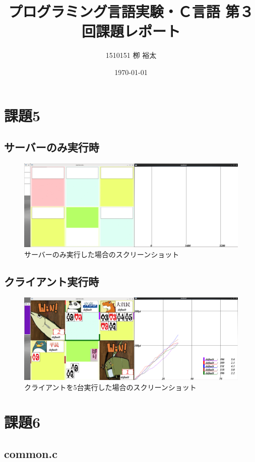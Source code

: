 \documentclass[11pt,a4paper, uplatex]{jsarticle}
\title{プログラミング言語実験・Ｃ言語 第３回課題レポート}
\author{1510151  栁 裕太}
\date{\today}
\begin{document}
\maketitle
\section{課題5}
%
\subsection{サーバーのみ実行時}

\begin{figure}[h]
  \centering
  \caption{サーバーのみ実行した場合のスクリーンショット}
  \includegraphics[width=120mm]{ex5-scs.png}
\end{figure}
\subsection{クライアント実行時}

\begin{figure}[h]
  \centering
  \caption{クライアントを5台実行した場合のスクリーンショット}
  \includegraphics[width=120mm]{./ex5-scs2.png}
\end{figure}

\section{課題6}
%
\subsection{common.c}
%
\end{document}
